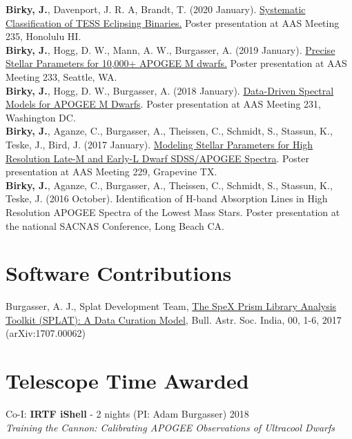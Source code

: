 \documentclass[margin,line]{resume}
\begin{document}
\begin{resume}
\textbf{Birky, J.}, Davenport, J. R. A, Brandt, T. (2020 January). \href{https://doi.org/10.5281/zenodo.3605647}{Systematic Classification of TESS Eclipsing Binaries.} Poster presentation at AAS Meeting 235, Honolulu HI. \\
\newline
\textbf{Birky, J.}, Hogg, D. W., Mann, A. W., Burgasser, A. (2019 January). \href{https://doi.org/10.5281/zenodo.2536586}{Precise Stellar Parameters for 10,000+ APOGEE M dwarfs.} Poster presentation at AAS Meeting 233, Seattle, WA. \\
\newline
\textbf{Birky, J.}, Hogg, D. W., Burgasser, A. (2018 January). \href{http://doi.org/10.5281/zenodo.1146909}{Data-Driven Spectral Models for APOGEE M Dwarfs}. Poster presentation at AAS Meeting 231, Washington DC. \\
\newline
\textbf{Birky, J.}, Aganze, C., Burgasser, A., Theissen, C., Schmidt, S., Stassun, K.,  Teske, J., Bird, J. (2017 January). \href{http://doi.org/10.5281/zenodo.1116625}{Modeling Stellar Parameters for High Resolution Late-M and Early-L Dwarf SDSS/APOGEE Spectra}. Poster presentation at AAS Meeting 229, Grapevine TX.  \\
\newline
\textbf{Birky, J.}, Aganze, C., Burgasser, A., Theissen, C., Schmidt, S., Stassun, K.,  Teske, J. (2016 October). Identification of H-band Absorption Lines in High Resolution APOGEE Spectra of the Lowest Mass Stars. Poster presentation at the national SACNAS Conference, Long Beach CA. 


\section{\mysidestyle \textcolor{bcolor}{Software Contributions}}
Burgasser, A. J., Splat Development Team, \href{https://arxiv.org/abs/1707.00062}{The SpeX Prism Library Analysis Toolkit (SPLAT): A Data Curation Model}, Bull. Astr. Soc. India, 00, 1-6, 2017 (arXiv:1707.00062)


\section{\mysidestyle \textcolor{bcolor}{Telescope Time Awarded}}
Co-I: \textbf{IRTF iShell} - 2 nights (PI: Adam Burgasser) \hfill 2018 \\ 
\-\hspace{.25cm} \textit{Training the Cannon: Calibrating APOGEE Observations of Ultracool Dwarfs} 


\end{resume}
\end{document}
